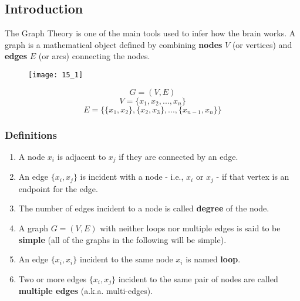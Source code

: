 \subsection{Introduction}
The Graph Theory is one of the main tools used to infer how the brain works. A graph is a mathematical object defined
by combining \textbf{nodes} \(V\) (or vertices) and \textbf{edges} \(E\) (or arcs) connecting the nodes.
\begin{figure}[H]
    \centering
    \texttt{[image: 15\_1]}
\end{figure}
\begin{equation*}
    G=(V,E)
\end{equation*}
\begin{equation*}
    V=\{x_1, x_2, ..., x_n\}
\end{equation*}
\begin{equation*}
    E=\{\{x_1, x_2\}, \{x_2,x_3\},..., \{x_{n-1},x_n\}\}
\end{equation*}
\subsubsection{Definitions}
\begin{enumerate}
    \item A node \(x_i\) is adjacent to \(x_j\) if they are connected by an edge.
    \item An edge \(\{x_i, x_j\}\) is incident with a node - i.e., \(x_i\) or \(x_j\) - if that vertex is an endpoint
          for the edge.
    \item The number of edges incident to a node is called \textbf{degree} of the node.
    \item A graph \(G=(V,E)\) with neither loops nor multiple edges is said to be \textbf{simple} (all of the graphs in
          the following will be simple).
    \item An edge \(\{x_i,x_i\}\) incident to the same node \(x_i\) is named \textbf{loop}.
    \item Two or more edges \(\{x_i,x_j\}\) incident to the same pair of nodes are called \textbf{multiple edges}
          (a.k.a. multi-edges).
\end{enumerate}
